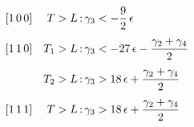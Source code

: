 \documentclass[preview]{standalone}
\begin{document}
\begin{align*}
\begin{array}{@{}l@{\quad}r@{\,:\,}l@{}}
            {[1\,0\,0]} & T>L   & \gamma_3 < -\dfrac{9}{2}\,\epsilon \\[2.5ex]
            {[1\,1\,0]} & T_1>L & \gamma_3 < -27\,\epsilon - \dfrac{\gamma_2+\gamma_4}{2} \\[2.5ex]
                        & T_2>L & \gamma_3 > 18\,\epsilon + \dfrac{\gamma_2+\gamma_4}{2} \\[2.5ex]
            {[1\,1\,1]} & T>L   & \gamma_3 > 18\,\epsilon + \dfrac{\gamma_2+\gamma_4}{2}\,
            \end{array}
\end{align*}
\end{document}
